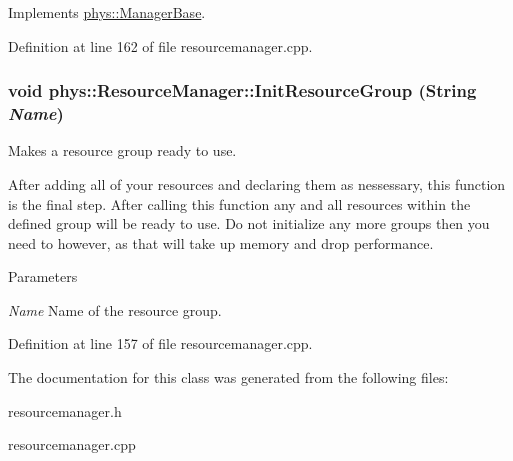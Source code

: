 Implements \hyperlink{classphys_1_1ManagerBase_a57dd8e54e767427d5bdcc86dc66d73ed}{phys::ManagerBase}.



Definition at line 162 of file resourcemanager.cpp.

\hypertarget{classphys_1_1ResourceManager_add022c243265fa397d91da3b3cbcce88}{
\subsubsection[{InitResourceGroup}]{\setlength{\rightskip}{0pt plus 5cm}void phys::ResourceManager::InitResourceGroup ({\bf String} {\em Name})}}
\label{d1/d35/classphys_1_1ResourceManager_add022c243265fa397d91da3b3cbcce88}


Makes a resource group ready to use. 

After adding all of your resources and declaring them as nessessary, this function is the final step. After calling this function any and all resources within the defined group will be ready to use. Do not initialize any more groups then you need to however, as that will take up memory and drop performance. 
\begin{DoxyParams}{Parameters}
\item[{\em Name}]Name of the resource group. \end{DoxyParams}


Definition at line 157 of file resourcemanager.cpp.



The documentation for this class was generated from the following files:\begin{DoxyCompactItemize}
\item 
resourcemanager.h\item 
resourcemanager.cpp\end{DoxyCompactItemize}

